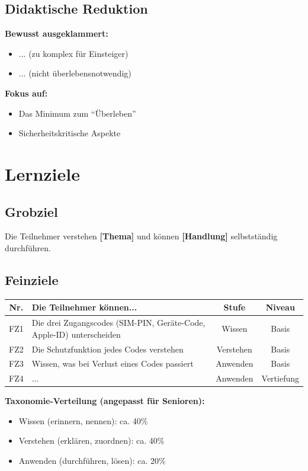 \documentclass[11pt,a4paper]{article}
\newcommand{\lernzielA}{Die drei Zugangscodes (SIM-PIN, Geräte-Code, Apple-ID) unterscheiden}
\newcommand{\lernzielB}{Die Schutzfunktion jedes Codes verstehen}
\newcommand{\lernzielC}{Wissen, was bei Verlust eines Codes passiert}
\begin{document}
\subsection{Didaktische Reduktion}

\textbf{Bewusst ausgeklammert:}
\begin{itemize}
    \item ... (zu komplex für Einsteiger)
    \item ... (nicht überlebensnotwendig)
\end{itemize}

\textbf{Fokus auf:}
\begin{itemize}
    \item Das Minimum zum ``Überleben''
    \item Sicherheitskritische Aspekte
\end{itemize}

\section{Lernziele}

\subsection{Grobziel}

Die Teilnehmer verstehen \textbf{[Thema]} und können \textbf{[Handlung]} selbstständig durchführen.

\subsection{Feinziele}

\begin{tabular}{|c|p{8cm}|c|c|}
\hline
\textbf{Nr.} & \textbf{Die Teilnehmer können...} & \textbf{Stufe} & \textbf{Niveau} \\
\hline
FZ1 & \lernzielA & Wissen & Basis \\
\hline
FZ2 & \lernzielB & Verstehen & Basis \\
\hline
FZ3 & \lernzielC & Anwenden & Basis \\
\hline
FZ4 & ... & Anwenden & Vertiefung \\
\hline
\end{tabular}

\vspace{1em}
\textbf{Taxonomie-Verteilung (angepasst für Senioren):}
\begin{itemize}
    \item Wissen (erinnern, nennen): ca. 40\%
    \item Verstehen (erklären, zuordnen): ca. 40\%
    \item Anwenden (durchführen, lösen): ca. 20\%
\end{itemize}
\end{document}
